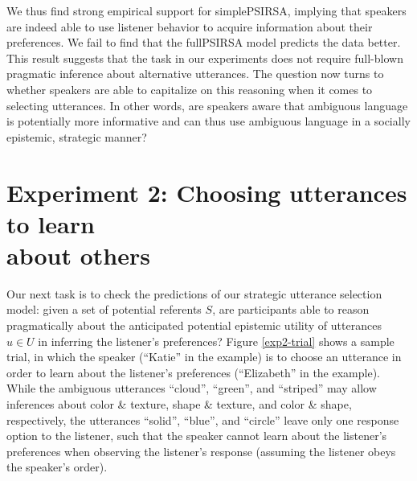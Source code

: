 \documentclass[11pt,a4paper]{article}
\begin{document}
We thus find strong empirical support for simplePSIRSA, implying that speakers are indeed able to use listener behavior to acquire information about their preferences. We fail to find that the fullPSIRSA model predicts the data better.
This result suggests that the task in our experiments does not require full-blown pragmatic inference about alternative utterances.
The question now turns to whether speakers are able to capitalize on this reasoning when it comes to selecting utterances. In other words, are speakers aware that ambiguous language is potentially more informative and can thus use ambiguous language in a socially epistemic, strategic manner?

\section{Experiment 2: Choosing utterances to learn \\ about others} \label{experiment2}

Our next task is to check the predictions of our strategic utterance selection model: given a set of potential referents $S$, are participants able to reason pragmatically about the anticipated potential epistemic utility of utterances $u\in U$ in inferring the listener's preferences? Figure \ref{exp2-trial} shows a sample trial, in which the speaker (``Katie'' in the example) is to choose an utterance in order to learn about the listener's preferences (``Elizabeth'' in the example). While the ambiguous utterances ``cloud'', ``green'', and ``striped'' may allow inferences about color \& texture, shape \& texture, and color \& shape, respectively, the utterances ``solid'', ``blue'', and ``circle'' leave only one response option to the listener, such that the speaker cannot learn about the listener's preferences when observing the listener's response (assuming the listener obeys the speaker's order).  
\end{document}
